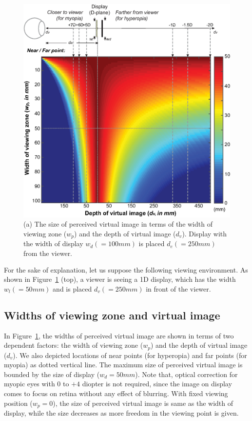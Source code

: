 \begin{figure}[t]
	    \begin{center}
   		\includegraphics[width=0.90\linewidth]{images/viewingZ_v3.eps}
	    \end{center}
	\caption{(a) The size of perceived virtual image in terms of the width of viewing zone ($w_p$) and the depth of virtual image ($d_v$). Display with the width of display $w_d(=100mm)$ is placed $d_e(=250mm)$ from the viewer.}
\label{fig:viewingZone}
\end{figure}

For the sake of explanation, let us suppose the following viewing environment. As shown in Figure~\ref{fig:viewingZone} (top), a viewer is seeing a 1D display, which has the width $w_l(=50mm)$ and is placed $d_v(=250mm)$ in front of the viewer. 

\subsection{Widths of viewing zone and virtual image}
In Figure~\ref{fig:viewingZone}, the widths of perceived virtual image are shown in terms of two dependent factors: the width of viewing zone ($w_p$) and the depth of virtual image ($d_v$). We also depicted locations of near points (for hyperopia) and far points (for myopia) as dotted vertical line. The maximum size of perceived virtual image is bounded by the size of display ($w_d=50mm$). Note that, optical correction for myopic eyes with $0$ to $+4$ diopter is not required, since the image on display comes to focus on retina without any effect of blurring. With fixed viewing position ($w_p=0$), the size of perceived virtual image is same as the width of display, while the size decreases as more freedom in the viewing point is given. 

